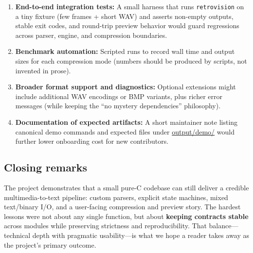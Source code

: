 \begin{enumerate}[label=\arabic*)]
    \item \textbf{End-to-end integration tests:} A small harness that runs \texttt{retrovision} on a tiny fixture (few frames + short WAV) and asserts non-empty outputs, stable exit codes, and round-trip preview behavior would guard regressions across parser, engine, and compression boundaries.
    \item \textbf{Benchmark automation:} Scripted runs to record wall time and output sizes for each compression mode (numbers should be produced by scripts, not invented in prose).
    \item \textbf{Broader format support and diagnostics:} Optional extensions might include additional WAV encodings or BMP variants, plus richer error messages (while keeping the ``no mystery dependencies'' philosophy).
    \item \textbf{Documentation of expected artifacts:} A short maintainer note listing canonical demo commands and expected files under \url{output/demo/} would further lower onboarding cost for new contributors.
\end{enumerate}

\subsection{Closing remarks}
The project demonstrates that a small pure-C codebase can still deliver a credible multimedia-to-text pipeline: custom parsers, explicit state machines, mixed text/binary I/O, and a user-facing compression and preview story. The hardest lessons were not about any single function, but about \textbf{keeping contracts stable} across modules while preserving strictness and reproducibility. That balance—technical depth with pragmatic usability—is what we hope a reader takes away as the project's primary outcome.
